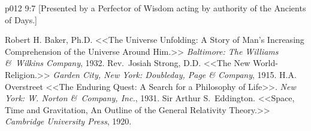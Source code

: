 \vsetoff
\vs p012 9:7 [Presented by a Perfector of Wisdom acting by authority of the Ancients of Days.]
\quizlink
\begin{thebibliography}{100}
Robert H. Baker, Ph.D.
{<<The Universe Unfolding: A Story of Man's Increasing Comprehension of the Universe Around Him.>>}
{\em Baltimore: The Williams \&\ Wilkins Company}, 1932.
Rev.~Josiah Strong, D.D.
{<<The New World\hyp{}Religion.>>}
{\em Garden City, New York: Doubleday, Page \& Company}, 1915.
H.A. Overstreet
{<<The Enduring Quest: A Search for a Philosophy of Life>>.}
{\em New York: W. Norton \&\ Company, Inc.}, 1931.
Sir Arthur S.~Eddington.
{<<Space, Time and Gravitation, An Outline of the General Relativity Theory.>>}
{\em Cambridge University Press}, 1920.
\end{thebibliography}
